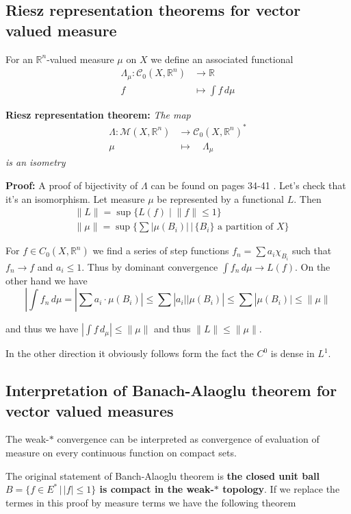 \documentclass{article}
\begin{document}
\subsection{Riesz representation theorems for vector valued measure}
For an $\mathbb{R}^n$-valued measure $\mu$ on $X$ we define an associated
functional
\begin{align*}
\Lambda_\mu:\mathcal C_0(X,\mathbb{R}^n)&\rightarrow\mathbb{R}\\
f&\mapsto\int f\,d\mu
\end{align*}

\textbf{Riesz representation theorem:} \textit{
The map
\begin{align*}
\Lambda:\mathcal{M}(X, \mathbb{R}^n)&\rightarrow\mathcal{C}_0(X,\mathbb{R}^n)^*\\
\mu\quad&\mapsto\quad\Lambda_\mu
\end{align*}
is an isometry}

\vspace{1ex}
\textbf{Proof:} A proof of bijectivity of $\Lambda$ can be found on pages 34-41
\cite{maggi}. Let's check that it's an isomorphism. Let measure $\mu$ be
represented by a functional $L$. Then 
\begin{align*}
    &\|L\|=\sup\{L(f)\;|\;\|f\|\le1\}\\
    &\|\mu\|=\sup\{\sum|\mu(B_i)|\,|\,\{B_i\}\text{ a partition of } X\}
\end{align*}

For $f\in C_0(X,\mathbb R^n)$ we find a series of step functions $f_n=\sum a_i\chi_{B_i}$ 
such that $f_n\rightarrow f$ and $a_i\leq 1$. Thus by dominant convergence
$\int f_n\,d\mu\rightarrow L(f)$. On the other hand we have
\[|\int f_n\,d\mu = |\sum a_i\cdot\mu(B_i)|\leq\sum|a_i||\mu(B_i)|\leq\sum|\mu(B_i)|\leq\|\mu\|\]

and thus we have $|\int f\,d_\mu|\leq\|\mu\|$ and thus $\|L\|\leq\|\mu\|$.

In the other direction it obviously follows form the fact the $C^0$ is dense
in $L^1$.

\subsection{Interpretation of Banach-Alaoglu theorem for vector valued measures}
The weak-$*$ convergence can be interpreted as convergence of evaluation of measure
on every continuous function on compact sets.

\vspace{2ex}
The original statement of Banch-Alaoglu theorem is \textbf{the closed unit ball
$B=\{f\in E^*\,|\,|f|\leq 1\}$ is compact in the weak-$*$ topology}. If we replace
the termes in this proof by measure terms we have the following theorem
\end{document}
